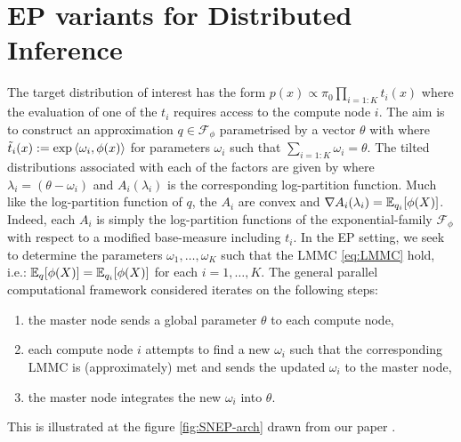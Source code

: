 \section{\label{sec:ep-for-dbi}EP variants for Distributed Inference}
The target distribution of interest has the form $p(x)\propto \pi_0\prod_{i=1:K}t_i(x)$ where the evaluation of one of the $t_i$ requires access to the compute node $i$. The aim is to construct an approximation $q\in\mathcal F_\phi$ parametrised by a vector $\theta$ with
%
%
where $\tilde t_i(x):=\exp\left\langle \omega_i,\phi(x) \right\rangle$ for parameters $\omega_{i}$ such that $\sum_{i=1:K}\omega_i=\theta$. The tilted distributions associated with each of the factors are given by
%
% 
where $\lambda_i=(\theta-\omega_i)$ and $A_i(\lambda_i)$ is the corresponding log-partition function. Much like the log-partition function of $q$, the $A_i$ are convex and $\nabla A_i(\lambda_i)=\mathbb E_{q_i}[\phi(X)]$. Indeed, each $A_i$ is simply the log-partition functions of the exponential-family $\mathcal F_\phi$ with respect to a modified base-measure including $t_i$.
In the EP setting, we seek to determine the parameters $\omega_1,\dots,\omega_K$ such that the LMMC \eqref{eq:LMMC} hold, i.e.: $\mathbb E_q[\phi(X)]=\mathbb E_{q_i}[\phi(X)]$ for each $i=1,\dots,K$.
The general parallel computational framework considered iterates on the following steps:
\begin{enumerate}\itsepa
	\item the master node sends a global parameter $\theta$ to each compute node,
	\item each compute node $i$ attempts to find a new $\omega_i$ such that the corresponding LMMC is (approximately) met and sends the updated $\omega_i$ to the master node,
	\item the master node integrates the new $\omega_i$ into $\theta$.
\end{enumerate} 

\noindent This is illustrated at the figure \ref{fig:SNEP-arch} drawn from our paper \citep{hasenclever16}.

